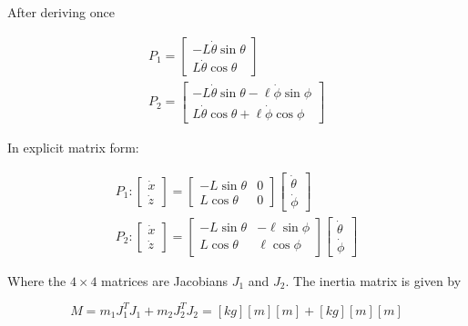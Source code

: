 After deriving once

\begin{gather}
    P_1 = \begin{bmatrix} 
        -L\dot{\theta}\sin\theta \\
        L\dot{\theta}\cos\theta
        \end{bmatrix}
    \\
    P_2 = \begin{bmatrix}
        -L\dot{\theta}\sin\theta - \ell\dot{\phi}\sin\phi\\
        L\dot{\theta}\cos\theta + \ell\dot{\phi}\cos\phi
        \end{bmatrix}
\end{gather}

In explicit matrix form:

\begin{gather}
    P_1: \begin{bmatrix} \dot{x} \\ \dot{z} \end{bmatrix} = \begin{bmatrix}
        -L\sin\theta & 0 \\
        L\cos\theta & 0
        \end{bmatrix} \begin{bmatrix} \dot{\theta} \\ \dot{\phi} \end{bmatrix} \label{eq:jacobian_1}
    \\
    P_2: \begin{bmatrix} \dot{x} \\ \dot{z} \end{bmatrix} = \begin{bmatrix}
        -L\sin\theta & -\ell\sin\phi \\
        L\cos\theta & \ell\cos\phi
        \end{bmatrix} \begin{bmatrix} \dot{\theta} \\ \dot{\phi} \end{bmatrix} \label{eq:jacobian_2}
\end{gather}

Where the $4 \times 4$ matrices are Jacobians $J_1$ and $J_2$.
The inertia matrix is given by

\begin{equation} \label{eq:inertia_matrix_general}
    M = m_1 J_1^T J_1 + m_2 J_2^T J_2 = [kg][m][m] + [kg][m][m]
\end{equation}

